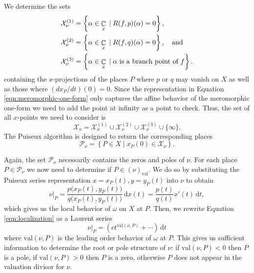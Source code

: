 \documentclass[12pt]{article}
\theoremstyle{definition}
\DeclareMathOperator{\CC}{\mathbb{C}}
\newcommand{\dx}{\,\mathrm{d}x}
\newcommand{\dt}{\,\mathrm{d}t}
\begin{document}
We determine the sets
\begin{align}
\mathcal{X}_\nu^{(1)} &=
\left\{
\alpha \in \CC_x \; | \; R(f,p)(\alpha) = 0
\right\}, \notag \\
\mathcal{X}_\nu^{(2)} &=
\left\{
\alpha \in \CC_x \; | \; R(f,q)(\alpha) = 0
\right\}, \quad \text{and} \notag \\
\mathcal{X}_\nu^{(3)} &=
\left\{
\alpha \in \CC_x \; | \; \alpha \text{ is a branch point of $f$}
\right\}.
\end{align}
containing the $x$-projections of the places $P$ where $p$ or $q$ may
vanish on $X$ as well as those where $(dx_P/dt)(0) = 0$. Since the
representation in Equation \ref{eqn:meromorphic-one-form} only captures
the affine behavior of the meromorphic one-form we need to add the point
at infinity as a point to check. Thus, the set of all $x$-points we need
to consider is
\begin{equation}
\mathcal{X}_\nu
=
\mathcal{X}_\nu^{(1)} \cup
\mathcal{X}_\nu^{(2)} \cup
\mathcal{X}_\nu^{(3)} \cup
\{ \infty \}.
\end{equation}
The Puiseux algorithm is designed to return the corresponding places
\begin{equation}
\mathcal{P}_\nu =
\left\{ P \in X \; | \; x_P(0) \in \mathcal{X}_\nu
\right\}.
\end{equation}

Again, the set $\mathcal{P}_\nu$ necessarily contains the zeros and
poles of $\nu$. For each place $P \in \mathcal{P}_\nu$ we now need to
determine if $P \in (\nu)_\text{val}$. We do so by substituting the
Puiseux series representation $x=x_P(t), y=y_P(t)$ into $\nu$ to obtain
\begin{equation} \label{eqn:localization}
\nu \big|_P
=
\frac{p\big(x_P(t),y_P(t)\big)}{q\big(x_P(t),y_P(t)\big)} \dx(t)
=
\frac{p(t)}{q(t)} x'(t) \dt,
\end{equation}
which gives us the local behavior of $\omega$ on $X$ at $P$. Then, we
rewrite Equation \ref{eqn:localization} as a Laurent series
\begin{equation}
\nu \big|_P = \left( c t^{\text{val}(\nu,P)} + \cdots \right) \dt
\end{equation}
where $\text{val}(\nu,P)$ is the leading order behavior of $\omega$ at
$P$. This gives us sufficient information to determine the root or pole
structure of $\nu$: if $\text{val}(\nu,P) < 0$ then $P$ is a pole, if
$\text{val}(\nu,P) > 0$ then $P$ is a zero, otherwise $P$ does not
appear in the valuation divisor for $\nu$.
\end{document}
